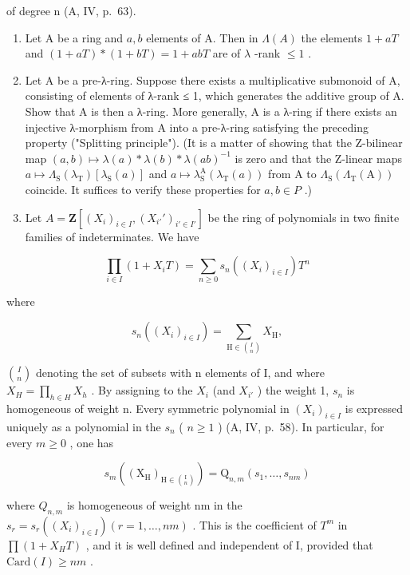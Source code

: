 of degree n (A, IV, p.~63).

\begin{enumerate}
\def\labelenumi{\alph{enumi})}
\setcounter{enumi}{1}
\item
  Let A be a ring and \(a, b\) elements of A. Then in \(\Lambda(A)\) the elements \(1 + aT\) and \((1 + aT)*(1 + bT) = 1 + abT\) are of \(\lambda\) -rank \(\leqslant 1\) .
\item
  Let A be a pre-λ-ring. Suppose there exists a multiplicative submonoid of A, consisting of elements of λ-rank ≤ 1, which generates the additive group of A. Show that A is then a λ-ring. More generally, A is a λ-ring if there exists an injective λ-morphism from A into a pre-λ-ring satisfying the preceding property ("Splitting principle"). (It is a matter of showing that the Z-bilinear map \((a, b) \mapsto \lambda(a) * \lambda(b) * \lambda(ab)^{-1}\) is zero and that the Z-linear maps \(a \mapsto \Lambda_{\mathrm{S}}(\lambda_{\mathrm{T}})[\lambda_{\mathrm{S}}(a)]\) and \(a \mapsto \lambda_{\mathrm{S}}^{\mathrm{A}}(\lambda_{\mathrm{T}}(a))\) from A to \(\Lambda_{\mathrm{S}}(\Lambda_{\mathrm{T}}(\mathrm{A}))\) coincide. It suffices to verify these properties for \(a, b \in P\) .)
\item
  Let \(A = \mathbf{Z}[(X_i)_{i\in I}, (X_{i'}')_{i'\in I'}]\) be the ring of polynomials in two finite families of indeterminates. We have
\end{enumerate}

\[
\prod_ {i \in I} (1 + X _ {i} T) = \sum_ {n \geqslant 0} s _ {n} ((X _ {i}) _ {i \in I}) T ^ {n}
\]

where

\[
s _ {n} \left(\left(X _ {i}\right) _ {i \in I}\right) = \sum_ {\mathrm{H} \in \binom {I} {n}} X _ {\mathrm{H}},
\]

\(\binom{I}{n}\) denoting the set of subsets with n elements of I, and where \(X_{H} = \prod_{h \in H} X_{h}\) . By assigning to the \(X_{i}\) (and \(X_{i'}\) ) the weight 1, \(s_{n}\) is homogeneous of weight n. Every symmetric polynomial in \((X_{i})_{i \in I}\) is expressed uniquely as a polynomial in the \(s_{n}\) ( \(n \geqslant 1\) ) (A, IV, p.~58). In particular, for every \(m \geqslant 0\) , one has

\[
s _ {m} \left(\left(\mathrm{X} _ {\mathrm{H}}\right) _ {\mathrm{H} \in \binom {\mathrm{I}} {n}}\right) = \mathrm{Q} _ {n, m} \left(s _ {1}, \dots , s _ {n m}\right)
\]

where \(Q_{n,m}\) is homogeneous of weight nm in the \(s_r = s_r((X_i)_{i \in I}) (r = 1, \ldots, nm)\) . This is the coefficient of \(T^m\) in \(\prod (1 + X_H T)\) , and it is well defined and independent of I, provided that \(\text{Card}(I) \geqslant nm\) .

